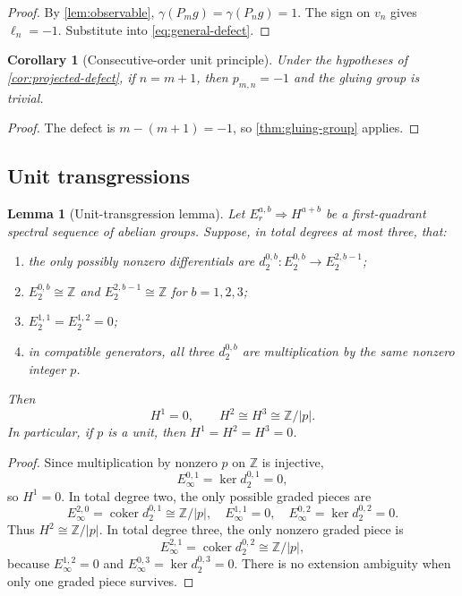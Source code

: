 \documentclass[11pt,reqno]{amsart}
\numberwithin{equation}{section}
\newcommand{\Z}{\mathbb Z}
\newcommand{\coker}{\operatorname{coker}}
\newtheorem{lemma}[theorem]{Lemma}
\newtheorem{corollary}[theorem]{Corollary}
\theoremstyle{definition}
\begin{document}
\begin{proof}
By \cref{lem:observable}, $\gamma(P_mg)=\gamma(P_ng)=1$. The sign on $v_n$ gives $\ell_n=-1$. Substitute into \cref{eq:general-defect}.
\end{proof}

\begin{corollary}[Consecutive-order unit principle]\label{cor:consecutive}
Under the hypotheses of \cref{cor:projected-defect}, if $n=m+1$, then $p_{m,n}=-1$ and the gluing group is trivial.
\end{corollary}

\begin{proof}
The defect is $m-(m+1)=-1$, so \cref{thm:gluing-group} applies.
\end{proof}

\subsection{Unit transgressions}

\begin{lemma}[Unit-transgression lemma]\label{lem:unit-transgression}
Let $E_r^{a,b}\Rightarrow H^{a+b}$ be a first-quadrant spectral sequence of abelian groups. Suppose, in total degrees at most three, that:
\begin{enumerate}
\item the only possibly nonzero differentials are $d_2^{0,b}:E_2^{0,b}\to E_2^{2,b-1}$;
\item $E_2^{0,b}\cong\Z$ and $E_2^{2,b-1}\cong\Z$ for $b=1,2,3$;
\item $E_2^{1,1}=E_2^{1,2}=0$;
\item in compatible generators, all three $d_2^{0,b}$ are multiplication by the same nonzero integer $p$.
\end{enumerate}
Then
\[
H^1=0,
\qquad
H^2\cong H^3\cong\Z/|p|.
\]
In particular, if $p$ is a unit, then $H^1=H^2=H^3=0$.
\end{lemma}

\begin{proof}
Since multiplication by nonzero $p$ on $\Z$ is injective,
\[
E_\infty^{0,1}=\ker d_2^{0,1}=0,
\]
so $H^1=0$. In total degree two, the only possible graded pieces are
\[
E_\infty^{2,0}=\coker d_2^{0,1}\cong\Z/|p|,
\quad
E_\infty^{1,1}=0,
\quad
E_\infty^{0,2}=\ker d_2^{0,2}=0.
\]
Thus $H^2\cong\Z/|p|$. In total degree three, the only nonzero graded piece is
\[
E_\infty^{2,1}=\coker d_2^{0,2}\cong\Z/|p|,
\]
because $E_\infty^{1,2}=0$ and $E_\infty^{0,3}=\ker d_2^{0,3}=0$. There is no extension ambiguity when only one graded piece survives.
\end{proof}
\end{document}
